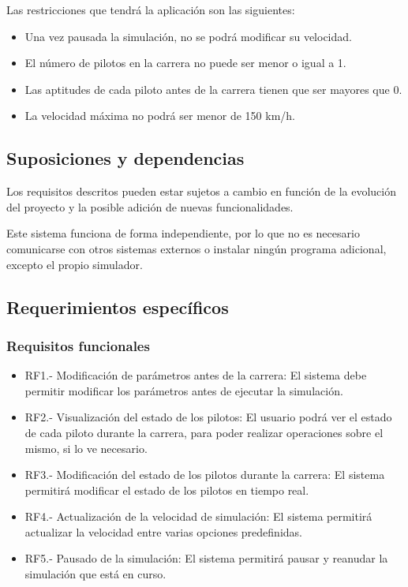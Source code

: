 Las restricciones que tendrá la aplicación son las siguientes:

\begin{itemize}
    \item Una vez pausada la simulación, no se podrá modificar su velocidad.
    \item El número de pilotos en la carrera no puede ser menor o igual a 1.
    \item Las aptitudes de cada piloto antes de la carrera tienen que ser mayores que 0.
    \item La velocidad máxima no podrá ser menor de 150 km/h.
\end{itemize}

\subsection{Suposiciones y dependencias}

Los requisitos descritos pueden estar sujetos a cambio en función de la evolución del proyecto y la posible adición de nuevas funcionalidades. 

Este sistema funciona de forma independiente, por lo que no es necesario comunicarse con otros sistemas externos o instalar ningún programa adicional, excepto el propio simulador.

\subsection{Requerimientos específicos}

\subsubsection{Requisitos funcionales}

\begin{itemize}
    \item RF1.- Modificación de parámetros antes de la carrera: El sistema debe permitir modificar los parámetros antes de ejecutar la simulación.
    \item RF2.- Visualización del estado de los pilotos: El usuario podrá ver el estado de cada piloto durante la carrera, para poder realizar operaciones sobre el mismo, si lo ve necesario.
    \item RF3.- Modificación del estado de los pilotos durante la carrera: El sistema permitirá modificar el estado de los pilotos en tiempo real.
    \item RF4.- Actualización de la velocidad de simulación: El sistema permitirá actualizar la velocidad entre varias opciones predefinidas.
    \item RF5.- Pausado de la simulación: El sistema permitirá pausar y reanudar la simulación que está en curso.
\end{itemize}


